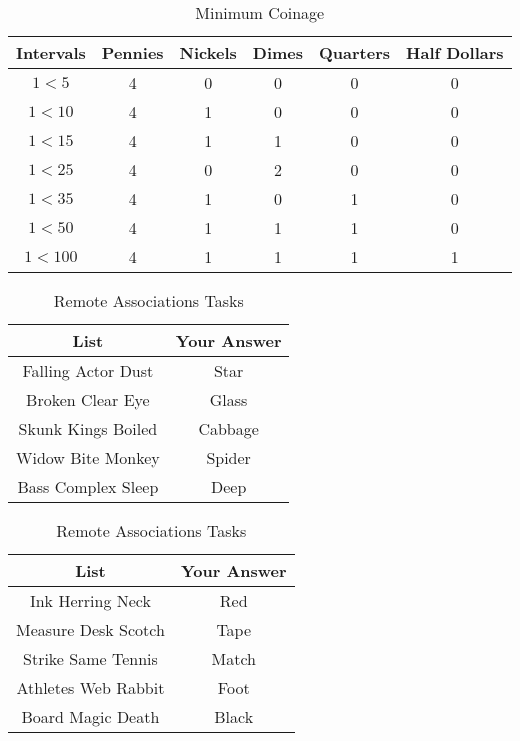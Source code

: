 \documentclass[stu,12pt,floatsintext]{apa7}
\begin{document}
\begin{table}[htbp]
	\centering
	\begin{tabular}{cccccc}
		\toprule
		\textbf{Intervals} & \textbf{Pennies} & \textbf{Nickels} & \textbf{Dimes} & \textbf{Quarters} & \textbf{Half Dollars} \\ \midrule
		\(1 < 5\) & 4 & 0 & 0 & 0 & 0 \\ \midrule
		\(1 < 10\) & 4 & 1 & 0 & 0 & 0 \\ \midrule
		\(1 < 15\) & 4 & 1 & 1 & 0 & 0 \\ \midrule 
		\(1 < 25\) & 4 & 0 & 2 & 0 & 0 \\ \midrule
		\(1 < 35\) & 4 & 1 & 0 & 1 & 0 \\ \midrule
		\(1 < 50\) & 4 & 1 & 1 & 1 & 0 \\ \midrule 
		\(1 < 100\) & 4 & 1 & 1 & 1 & 1 \\  
		\bottomrule
	\end{tabular}
	\caption{Minimum Coinage}\label{tab:table4}
\end{table}

\begin{table}[h]
\centering
\begin{minipage}{0.45\textwidth}
    \begin{tabular}{cc}
        \toprule
        \textbf{List} & \textbf{Your Answer} \\
        \midrule
        Falling Actor Dust & Star \\
        \midrule
        Broken Clear Eye & Glass \\
        \midrule
        Skunk Kings Boiled & Cabbage \\        
		\midrule
        Widow Bite Monkey & Spider \\
        \midrule
        Bass Complex Sleep & Deep \\
        \bottomrule
    \end{tabular}
\end{minipage}
\hfill
\begin{minipage}{0.45\textwidth}
    \begin{tabular}{cc}
        \toprule
        \textbf{List} & \textbf{Your Answer} \\
        \midrule
        Ink Herring Neck & Red \\
        \midrule
        Measure Desk Scotch & Tape \\
        \midrule
		Strike Same Tennis & Match \\        
		\midrule
        Athletes Web Rabbit & Foot \\        
		\midrule
        Board Magic Death & Black \\
        \bottomrule
    \end{tabular}
\end{minipage}
\vspace{0.25cm}
\caption{Remote Associations Tasks}\label{tab:table5}
\end{table}
\end{document}
